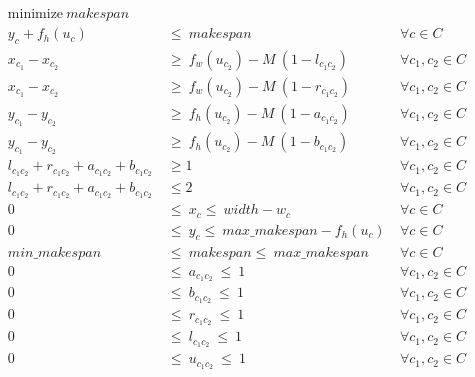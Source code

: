     \begin{subequations}
        \label{ilp:rot}
        \begin{align}
        \label{ilp:rot_obj} \text{minimize}\ makespan                                   &\  &\                       \\
        \label{ilp:rot_ycons}  y_c + f_h(u_c)       &\ \leq\ makespan                       &\ \forall c \in C       \\
        \label{ilp:rot_diffn1} x_{c_1} - x_{c_2} &\ \geq\ f_w(u_{c_2}) - M\ (1-l_{c_1c_2})  &\ \forall c_1, c_2 \in C\\ 
        \label{ilp:rot_diffn2} x_{c_1} - x_{c_2} &\ \geq\ f_w(u_{c_2}) - M\ (1-r_{c_1c_2})  &\ \forall c_1, c_2 \in C\\ 
        \label{ilp:rot_diffn3} y_{c_1} - y_{c_2} &\ \geq\ f_h(u_{c_2}) - M\ (1-a_{c_1c_2})  &\ \forall c_1, c_2 \in C\\ 
        \label{ilp:rot_diffn4} y_{c_1} - y_{c_2} &\ \geq\ f_h(u_{c_2}) - M\ (1-b_{c_1c_2})  &\ \forall c_1, c_2 \in C\\ 
        \label{ilp:rot_diffn5} l_{c_1c_2} + r_{c_1c_2} + a_{c_1c_2} + b_{c_1c_2}  &\ \geq 1 &\ \forall c_1, c_2 \in C\\
        \label{ilp:rot_diffn6} l_{c_1c_2} + r_{c_1c_2} + a_{c_1c_2} + b_{c_1c_2}  &\ \leq 2 &\ \forall c_1, c_2 \in C\\
        \label{ilp:rot_b_x} 0                       &\ \leq\ x_c \leq\ width - w_c          &\ \forall c \in C       \\
        \label{ilp:rot_b_y} 0                    &\ \leq\ y_c \leq\ max\_makespan-f_h(u_c)  &\ \forall c \in C       \\
        \label{ilp:rot_b_makspan} min\_makespan     &\ \leq\ makespan \leq\ max\_makespan   &\ \forall c \in C       \\
        \label{ilp:rot_b_a} 0\                      &\ \leq\ a_{c_1c_2}\ \leq\ 1            &\ \forall c_1,c_2 \in C \\
        \label{ilp:rot_b_b} 0\                      &\ \leq\ b_{c_1c_2}\ \leq\ 1            &\ \forall c_1,c_2 \in C \\
        \label{ilp:rot_b_r} 0\                      &\ \leq\ r_{c_1c_2}\ \leq\ 1            &\ \forall c_1,c_2 \in C \\
        \label{ilp:rot_b_l} 0\                      &\ \leq\ l_{c_1c_2}\ \leq\ 1            &\ \forall c_1,c_2 \in C \\
        \label{ilp:rot_b_u} 0\                      &\ \leq\ u_{c_1c_2}\ \leq\ 1            &\ \forall c_1,c_2 \in C
        \end{align}    
    \end{subequations}

